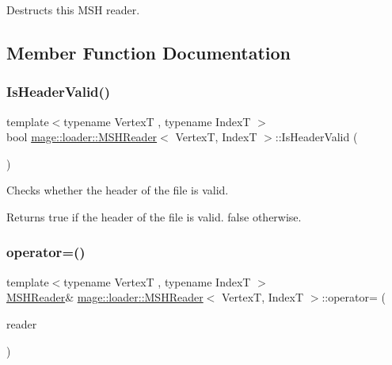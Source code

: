 Destructs this M\+SH reader. 

\subsection{Member Function Documentation}
\hypertarget{classmage_1_1loader_1_1_m_s_h_reader_aa57b3fe6bc5bfc6ae92ad761e210bbcf}{}\label{classmage_1_1loader_1_1_m_s_h_reader_aa57b3fe6bc5bfc6ae92ad761e210bbcf} 
\subsubsection{\texorpdfstring{Is\+Header\+Valid()}{IsHeaderValid()}}
{\footnotesize\ttfamily template$<$typename VertexT , typename IndexT $>$ \\
bool \hyperlink{classmage_1_1loader_1_1_m_s_h_reader}{mage\+::loader\+::\+M\+S\+H\+Reader}$<$ VertexT, IndexT $>$\+::Is\+Header\+Valid (\begin{DoxyParamCaption}{ }\end{DoxyParamCaption})\hspace{0.3cm}{\ttfamily [private]}}

Checks whether the header of the file is valid.

\begin{DoxyReturn}{Returns}
{\ttfamily true} if the header of the file is valid. {\ttfamily false} otherwise. 
\end{DoxyReturn}
\hypertarget{classmage_1_1loader_1_1_m_s_h_reader_a4bff04c1c970cf2a5d54e3412e41bc07}{}\label{classmage_1_1loader_1_1_m_s_h_reader_a4bff04c1c970cf2a5d54e3412e41bc07} 
\subsubsection{\texorpdfstring{operator=()}{operator=()}\hspace{0.1cm}{\footnotesize\ttfamily [1/2]}}
{\footnotesize\ttfamily template$<$typename VertexT , typename IndexT $>$ \\
\hyperlink{classmage_1_1loader_1_1_m_s_h_reader}{M\+S\+H\+Reader}\& \hyperlink{classmage_1_1loader_1_1_m_s_h_reader}{mage\+::loader\+::\+M\+S\+H\+Reader}$<$ VertexT, IndexT $>$\+::operator= (\begin{DoxyParamCaption}\item[{const \hyperlink{classmage_1_1loader_1_1_m_s_h_reader}{M\+S\+H\+Reader}$<$ VertexT, IndexT $>$ \&}]{reader }\end{DoxyParamCaption})\hspace{0.3cm}{\ttfamily [delete]}}

